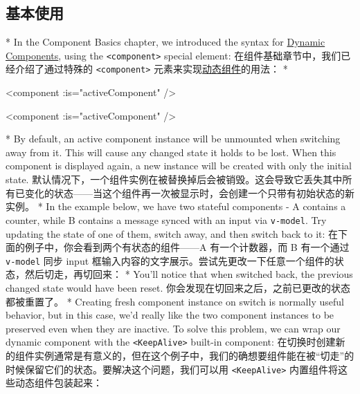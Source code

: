\begin{paracol}{2}
\subsection{基本使用}
\switchcolumn[0]*%
In the Component Basics chapter, we introduced the syntax for
\href{https://vuejs.org/guide/essentials/component-basics.html\#dynamic-components}{Dynamic
Components}, using the \texttt{\textless{}component\textgreater{}}
special element:
\switchcolumn
在组件基础章节中，我们已经介绍了通过特殊的
\texttt{\textless{}component\textgreater{}}
元素来实现\href{https://cn.vuejs.org/guide/essentials/component-basics.html\#dynamic-components}{动态组件}的用法： 
\switchcolumn[0]*%
\begin{codeHtml}
<component :is="activeComponent" />
\end{codeHtml}
\switchcolumn
\begin{codeHtml}
<component :is="activeComponent" />
\end{codeHtml}
\switchcolumn[0]*%
By default, an active component instance will be unmounted when
switching away from it. This will cause any changed state it holds to be
lost. When this component is displayed again, a new instance will be
created with only the initial state.
\switchcolumn
默认情况下，一个组件实例在被替换掉后会被销毁。这会导致它丢失其中所有已变化的状态------当这个组件再一次被显示时，会创建一个只带有初始状态的新实例。
\switchcolumn[0]*%
In the example below, we have two stateful components - A contains a
counter, while B contains a message synced with an input via
\texttt{v-model}. Try updating the state of one of them, switch away,
and then switch back to it:
\switchcolumn
在下面的例子中，你会看到两个有状态的组件------A 有一个计数器，而 B
有一个通过 \texttt{v-model} 同步 input
框输入内容的文字展示。尝试先更改一下任意一个组件的状态，然后切走，再切回来：
\switchcolumn[0]*%
You'll notice that when switched back, the previous changed state would
have been reset.
\switchcolumn
你会发现在切回来之后，之前已更改的状态都被重置了。 
\switchcolumn[0]*%
Creating fresh component instance on switch is normally useful behavior,
but in this case, we'd really like the two component instances to be
preserved even when they are inactive. To solve this problem, we can
wrap our dynamic component with the
\texttt{\textless{}KeepAlive\textgreater{}} built-in component:
\switchcolumn
在切换时创建新的组件实例通常是有意义的，但在这个例子中，我们的确想要组件能在被``切走''的时候保留它们的状态。要解决这个问题，我们可以用
\texttt{\textless{}KeepAlive\textgreater{}}
内置组件将这些动态组件包装起来：

\end{paracol}
